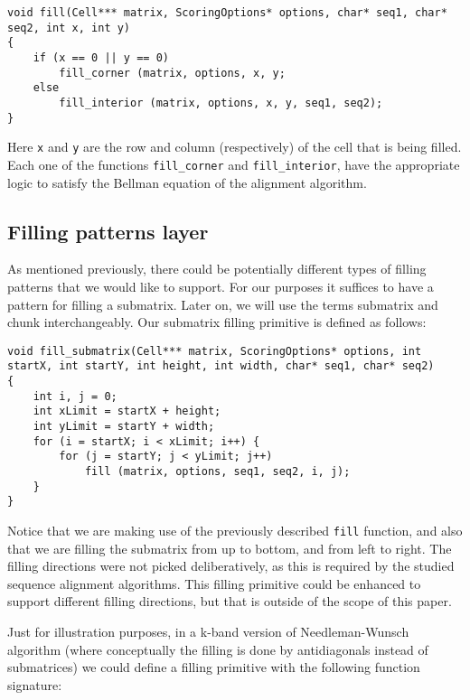 \documentclass[journal]{IEEEtran}
\begin{document}
\lstset{language=C}
\begin{lstlisting}[linewidth=\columnwidth,breaklines=true]
void fill(Cell*** matrix, ScoringOptions* options, char* seq1, char* seq2, int x, int y) 
{
	if (x == 0 || y == 0)
		fill_corner (matrix, options, x, y;
	else
		fill_interior (matrix, options, x, y, seq1, seq2);
}
\end{lstlisting}

Here {\tt x} and {\tt y} are the row and column (respectively) of the cell that is being filled. Each one of the functions {\tt fill\_corner} and {\tt fill\_interior}, have the appropriate logic to satisfy the Bellman equation of the alignment algorithm. 

\subsection{Filling patterns layer}

As mentioned previously, there could be potentially different types of filling patterns that we would like to support. For our purposes it suffices to have a pattern for filling a submatrix. Later on, we will use the terms submatrix and chunk interchangeably. Our submatrix filling primitive is defined as follows:

\lstset{language=C}
\begin{lstlisting}[linewidth=\columnwidth,breaklines=true]
void fill_submatrix(Cell*** matrix, ScoringOptions* options, int startX, int startY, int height, int width, char* seq1, char* seq2) 
{
	int i, j = 0;
	int xLimit = startX + height;
	int yLimit = startY + width;
	for (i = startX; i < xLimit; i++) {
		for (j = startY; j < yLimit; j++)
			fill (matrix, options, seq1, seq2, i, j);
	}
}
\end{lstlisting}

Notice that we are making use of the previously described {\tt fill} function, and also that we are filling the submatrix from up to bottom, and from left to right. The filling directions were not picked deliberatively, as this is required by the studied sequence alignment algorithms. This filling primitive could be enhanced to support different filling directions, but that is outside of the scope of this paper.

Just for illustration purposes, in a k-band version of Needleman-Wunsch algorithm (where conceptually the filling is done by antidiagonals instead of submatrices) we could define a filling primitive with the following function signature:
\end{document}
